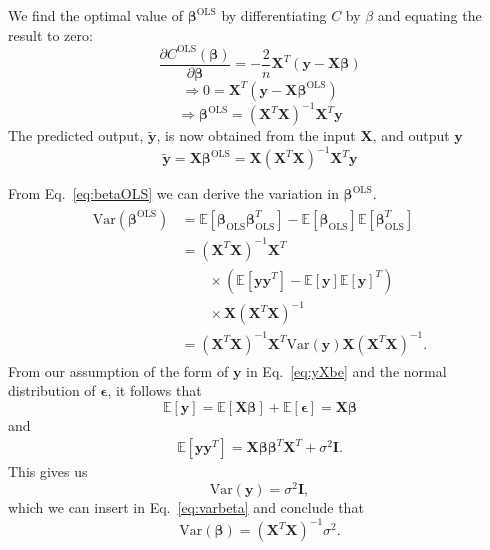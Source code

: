 \documentclass[a4paper, 
amsfonts, 
amssymb, 
amsmath, 
reprint, 
showkeys, 
nofootinbib, 
twoside]{revtex4-2}
\begin{document}
We find the optimal value of $\bm{\beta}^{\textrm{OLS}}$ by differentiating $C$ by $\beta$ and equating the result to zero:
\begin{equation}
    \frac{\partial C^{\textrm{OLS}}(\bm{\beta})}{\partial \bm{\beta}} = -\frac{2}{n}\bm{X}^T(\bm{y} - \bm{X\beta})
\end{equation}
\begin{equation}
    \Rightarrow 0 = \bm{X}^T(\bm{y} - \bm{X}\bm{\beta}^{\textrm{OLS}})
\end{equation}
\begin{equation}
    \Rightarrow \bm{\beta}^{\textrm{OLS}} = (\bm{X}^T\bm{X})^{-1}\bm{X}^T\bm{y}
    \label{eq:betaOLS}
\end{equation}
The predicted output, $\bm{\tilde{y}}$, is now obtained from the input $\bm{X}$, and output $\bm{y}$
\begin{equation}
    \bm{\tilde{y}} = \bm{X\beta}^{\textrm{OLS}} = \bm{X}(\bm{X}^T\bm{X})^{-1}\bm{X}^T\bm{y}
\end{equation}

From Eq.~\eqref{eq:betaOLS} we can derive the variation in $\bm{\beta}^\textrm{OLS}$.
\begin{align}
\begin{split}
    \textrm{Var}(\bm{\beta}^{\textrm{OLS}}) 
        &= \mathbb{E}[\bm{\beta}_\textrm{OLS} \bm{\beta}_\textrm{OLS}^T] 
            - \mathbb{E}[\bm{\beta}_\textrm{OLS}]\mathbb{E}[\bm{\beta}_\textrm{OLS}^T] \\
        &= (\bm{X}^T\bm{X})^{-1}\bm{X}^T \\
        &\qquad \times (\mathbb{E}[\bm{y}\bm{y}^T] - \mathbb{E}[\bm{y}]\mathbb{E}[\bm{y}]^T) \\
        &\qquad \times \bm{X} (\bm{X}^T \bm{X})^{-1} \\
        &= (\bm{X}^T\bm{X})^{-1}\bm{X}^T \textrm{Var}(\bm{y}) \bm{X} (\bm{X}^T \bm{X})^{-1}.
\end{split}
\label{eq:varbeta}
\end{align}
From our assumption of the form of $\bm{y}$ in Eq.~\eqref{eq:yXbe} and the normal distribution of $\bm{\epsilon}$, it follows that 
\begin{equation}
    \mathbb{E}[\bm{y}] = \mathbb{E}[\bm{X}\bm{\beta}] + \mathbb{E}[\bm{\epsilon}] = \bm{X}\bm{\beta}
\end{equation}
and 
\begin{align}
    \mathbb{E}[\bm{y}\bm{y}^T] 
        = \bm{X}\bm{\beta} \bm{\beta}^T \bm{X}^T + \sigma^2 \bm{I}.
\end{align}
This gives us 
\begin{equation}
    \textrm{Var}(\bm{y}) = \sigma^2 \bm{I},
\end{equation}
which we can insert in Eq.~\eqref{eq:varbeta} and conclude that
\begin{equation}
    \textrm{Var}(\bm{\beta}) = (\bm{X}^T\bm{X})^{-1} \sigma^2.
\end{equation}
\end{document}
